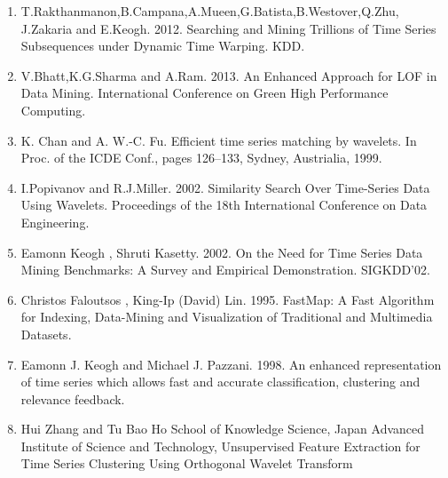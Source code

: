 \begin{enumerate}
\item T.Rakthanmanon,B.Campana,A.Mueen,G.Batista,B.Westover,Q.Zhu, J.Zakaria and E.Keogh. 2012. Searching and Mining Trillions of Time Series Subsequences under Dynamic Time Warping. KDD.\\
\item V.Bhatt,K.G.Sharma and A.Ram. 2013. An Enhanced Approach for LOF in Data Mining. International Conference on Green High Performance Computing.\\
\item K. Chan and A. W.-C. Fu. Efficient time series matching by wavelets. In Proc. of the ICDE Conf., pages 126–133, Sydney, Austrialia, 1999.\\
\item I.Popivanov and R.J.Miller. 2002. Similarity Search Over Time-Series Data Using Wavelets. Proceedings of the 18th International Conference on Data Engineering.\\
\item Eamonn Keogh , Shruti Kasetty. 2002. On the Need for Time Series Data Mining Benchmarks: A Survey and Empirical Demonstration. SIGKDD'02.\\
\item Christos Faloutsos , King-Ip (David) Lin. 1995. FastMap: A Fast Algorithm for Indexing, Data-Mining and Visualization of Traditional and Multimedia Datasets.\\
\item Eamonn J. Keogh and Michael J. Pazzani. 1998. An enhanced representation of time series which allows fast and accurate classification, clustering and relevance feedback.\\
\item Hui Zhang and Tu Bao Ho School of Knowledge Science, Japan Advanced Institute of Science and Technology, Unsupervised Feature Extraction for Time Series Clustering Using Orthogonal Wavelet Transform\\
\end{enumerate}
